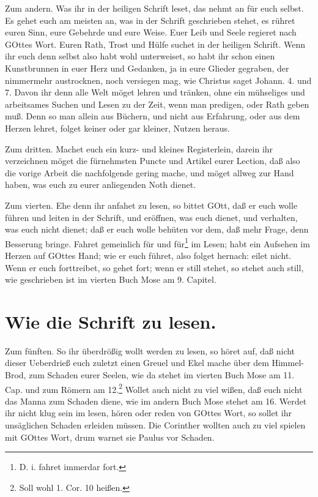 Zum andern. Was ihr in der heiligen Schrift leset, das nehmt an für euch selbst. Es gehet euch am meisten an, was in der Schrift geschrieben stehet, es rühret euren Sinn, eure Gebehrde und eure Weise. Euer Leib und Seele regieret nach GOttes Wort. Euren Rath, Trost und Hülfe suchet in der heiligen Schrift. Wenn ihr euch denn selbst also habt wohl unterweiset, so habt ihr schon einen Kunstbrunnen in euer Herz und Gedanken, ja in eure Glieder gegraben, der nimmermehr austrocknen, noch versiegen mag, wie Christus saget Johann. 4. und 7. Davon ihr denn alle Welt möget lehren und tränken, ohne ein mühseliges und arbeitsames Suchen und Lesen zu der Zeit, wenn man predigen, oder Rath geben muß. Denn so man allein aus Büchern, und nicht aus Erfahrung, oder aus dem Herzen lehret, folget keiner oder gar kleiner, Nutzen heraus.

Zum dritten. Machet euch ein kurz- und kleines Registerlein, darein ihr verzeichnen möget die fürnehmsten Puncte und Artikel eurer Lection, daß also die vorige Arbeit die nachfolgende gering mache, und möget allweg zur Hand haben, was euch zu eurer anliegenden Noth dienet.

Zum vierten. Ehe denn ihr anfahet zu lesen, so bittet GOtt, daß er euch wolle führen und leiten in der Schrift, und eröffnen, was euch dienet, und verhalten, was euch nicht dienet; daß er euch wolle behüten vor dem, daß mehr Frage, denn Besserung bringe. Fahret gemeinlich für und für\footnote{D. i. fahret immerdar fort.} im Lesen; habt ein Aufsehen
im Herzen auf GOttes Hand; wie er euch führet, also folget hernach: eilet nicht. Wenn er euch forttreibet, so gehet fort; wenn er still stehet, so stehet auch still, wie geschrieben ist im vierten Buch Mose am 9. Capitel.

\section*{Wie die Schrift zu lesen.}

Zum fünften. So ihr überdrößig wollt werden zu lesen, so höret auf, daß nicht dieser Ueberdrieß euch zuletzt einen Greuel und Ekel mache über dem Himmel-Brod, zum Schaden eurer Seelen, wie da stehet im vierten Buch Mose am 11. Cap. und zum Römern am 12.\footnote{Soll wohl 1. Cor. 10 heißen.} Wollet auch nicht zu viel wißen, daß euch nicht das Manna zum Schaden diene, wie im andern Buch Mose stehet am 16. Werdet ihr nicht klug sein im lesen, hören oder reden von GOttes Wort, so sollet ihr unsäglichen Schaden erleiden müssen. Die Corinther wollten auch zu viel spielen mit GOttes Wort, drum warnet sie Paulus vor Schaden.

